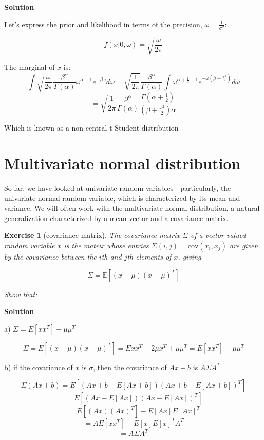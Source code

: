 \documentclass[twoside]{article}
\newcounter{lecnum}
\newtheorem{exercise}{Exercise}[lecnum]
\newcommand\E{\mathbb{E}}
\newcommand\cov{\mbox{cov}}
\begin{document}
\color{blue}
\textbf{Solution}

Let's express the prior and likelihood in terms of the precision, $\omega=\frac{1}{\sigma^2}$:

$$f(x|0, \omega) = \sqrt{\frac{\omega}{2\pi}} $$

The marginal of $x$ is:
$$ \int  \sqrt{\frac{\omega}{2\pi}}  \frac{\beta^\alpha}{\Gamma(\alpha)}\omega^{\alpha-1}e^{-\beta \omega} d\omega
=  \sqrt{\frac{1}{2\pi}} \frac{\beta^\alpha}{\Gamma(\alpha)} \int
\omega^{\alpha+\frac{1}{2}-1}
e^{-\omega(\beta+\frac{x^2}{2})}
d\omega $$
$$
= \sqrt{\frac{1}{2\pi}} \frac{\beta^\alpha}{\Gamma(\alpha)} \frac{\Gamma(\alpha + \frac{1}{2})}{(\beta + \frac{x^2}{2})\alpha}
$$

Which is known as a non-central t-Student distribution
\color{black}
\newpage


\section{Multivariate normal distribution}

So far, we have looked at univariate random variables - particularly, the univariate normal random variable, which is characterized by its mean and variance. We will often work with the multivariate normal distribution, a natural generalization characterized by a mean vector and a covariance matrix.

\begin{exercise}[covariance matrix]
  The covariance matrix $\Sigma$ of a vector-valued random variable $x$ is the matrix whose entries $\Sigma(i,j) = \cov(x_i,x_j)$ are given by the covariance between the $i$th and $j$th elements of $x$, giving

  $$\Sigma = \E\left[(x-\mu)(x-\mu)^T\right]$$

  Show that:
\end{exercise}

\color{blue}
\textbf{Solution}

a) $\Sigma =  E[xx^T] - \mu\mu^T$

$$\Sigma = E\left[(x-\mu)(x-\mu)^T\right] = E xx^T-2\mu x^T + \mu \mu^T = E[xx^T] - \mu\mu^T$$

b) if the covariance of $x$ is $\sigma$, then the covariance of $Ax+b$ is $A\Sigma A^T$

$$ \Sigma(Ax+b) = E\left[  (Ax+b-   E\left[  Ax+b\right])
 (Ax+b-   E\left[  Ax+b\right])^T\right] $$
 $$ = E\left[ (Ax- E\left[ Ax \right])(Ax- E\left[ Ax \right])^T \right] $$
$$ = E\left[ (Ax)(Ax)^T \right] - E\left[  Ax\right] E\left[  Ax\right]^T $$
$$ = A {E\left[  xx^T\right] - E\left[  x\right]E\left[ x \right]^T}A^T   $$
$$ = A\Sigma A^T $$
\end{document}
